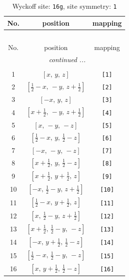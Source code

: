 \documentclass[fleqn,8pt]{jsarticle}
\begin{document}
\begin{longtable}{ccc}
\caption{Wyckoff site: {\tt 16g}, site symmetry: {\tt 1}}
 \\
 \hline \hline
No. & position & mapping \\ \hline \endfirsthead

\multicolumn{2}{l}{\tablename\ \thetable{}} \\
 \hline \hline
No. & position & mapping \\ \hline \endhead

 \hline \hline
\multicolumn{2}{r}{\footnotesize\it continued ...} \\ \endfoot

 \hline \hline
\multicolumn{2}{r}{} \\ \endlastfoot

1 & $\left[ x,\, y,\, z \right]$ & {\tt [1]} \\ \hline
2 & $\left[ \frac{1}{2} - x,\, - y,\, z + \frac{1}{2} \right]$ & {\tt [2]} \\ \hline
3 & $\left[ - x,\, y,\, z \right]$ & {\tt [3]} \\ \hline
4 & $\left[ x + \frac{1}{2},\, - y,\, z + \frac{1}{2} \right]$ & {\tt [4]} \\ \hline
5 & $\left[ x,\, - y,\, - z \right]$ & {\tt [5]} \\ \hline
6 & $\left[ \frac{1}{2} - x,\, y,\, \frac{1}{2} - z \right]$ & {\tt [6]} \\ \hline
7 & $\left[ - x,\, - y,\, - z \right]$ & {\tt [7]} \\ \hline
8 & $\left[ x + \frac{1}{2},\, y,\, \frac{1}{2} - z \right]$ & {\tt [8]} \\ \hline
9 & $\left[ x + \frac{1}{2},\, y + \frac{1}{2},\, z \right]$ & {\tt [9]} \\ \hline
10 & $\left[ - x,\, \frac{1}{2} - y,\, z + \frac{1}{2} \right]$ & {\tt [10]} \\ \hline
11 & $\left[ \frac{1}{2} - x,\, y + \frac{1}{2},\, z \right]$ & {\tt [11]} \\ \hline
12 & $\left[ x,\, \frac{1}{2} - y,\, z + \frac{1}{2} \right]$ & {\tt [12]} \\ \hline
13 & $\left[ x + \frac{1}{2},\, \frac{1}{2} - y,\, - z \right]$ & {\tt [13]} \\ \hline
14 & $\left[ - x,\, y + \frac{1}{2},\, \frac{1}{2} - z \right]$ & {\tt [14]} \\ \hline
15 & $\left[ \frac{1}{2} - x,\, \frac{1}{2} - y,\, - z \right]$ & {\tt [15]} \\ \hline
16 & $\left[ x,\, y + \frac{1}{2},\, \frac{1}{2} - z \right]$ & {\tt [16]} \\
\end{longtable}
\end{document}
